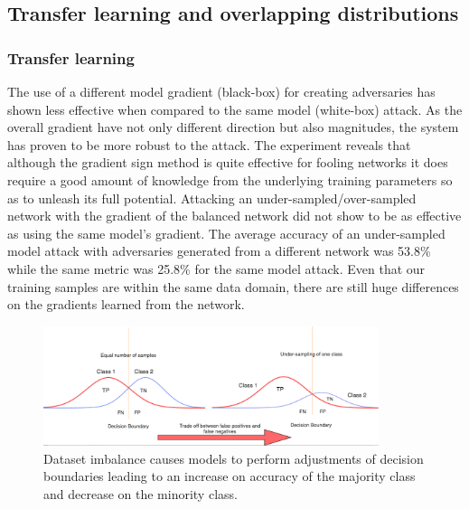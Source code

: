 \documentclass[runningheads,a4paper]{llncs}
\begin{document}
\subsection{Transfer learning and overlapping distributions}

\subsubsection{Transfer learning} The use of a different model gradient (black-box) for creating adversaries has shown less effective when compared to the same model (white-box) attack. As the overall gradient have not only different direction but also magnitudes, the system has proven to be more robust to the attack. The experiment reveals that although the gradient sign method is quite effective for fooling networks it does require a good amount of knowledge from the underlying training parameters so as to unleash its full potential. Attacking an under-sampled/over-sampled network with the gradient of the balanced network did not show to be as effective as using the same model's gradient. The average accuracy of an under-sampled model attack with adversaries generated from a different network was 53.8\% while the same metric was 25.8\% for the same model attack. Even that our training samples are within the same data domain, there are still huge differences on the gradients learned from the network. 
\begin{figure}
	\centering
	\includegraphics[height=3.5cm]{class_dist.png}
	\caption{Dataset imbalance causes models to perform adjustments of decision boundaries leading to an increase on accuracy of the majority class and decrease on the minority class.}
	\label{fig:class_dist}
\end{figure}
\end{document}
